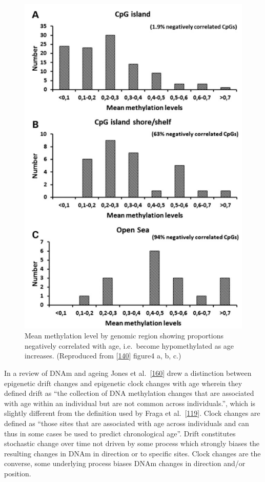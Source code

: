 \documentclass[
]{book}
\begin{document}
\begin{figure}

{\centering \includegraphics[width=0.8\linewidth]{figs/Florath2014_F4abc} 

}

\caption{Mean methylation level by genomic region showing proportions negatively correlated with age, i.e.~become hypomethylated as age increases. (Reproduced from {[}\protect\hyperlink{ref-Florath2014}{140}{]} figure4 a, b, c.)}\label{fig:Florath2014F4abc}
\end{figure}



In a review of DNAm and ageing Jones et al.~{[}\protect\hyperlink{ref-Jones2015}{160}{]} drew a distinction between epigenetic drift changes and epigenetic clock changes with age wherein they defined drift as ``the collection of DNA methylation changes that are associated with age within an individual but are not common across individuals.'', which is slightly different from the definition used by Fraga et al.~{[}\protect\hyperlink{ref-Fraga2005}{119}{]}.
Clock changes are defined as ``those sites that are associated with age across individuals and can thus in some cases be used to predict chronological age''.
Drift constitutes stochastic change over time not driven by some process which strongly biases the resulting changes in DNAm in direction or to specific sites.
Clock changes are the converse, some underlying process biases DNAm changes in direction and/or position.
\end{document}
